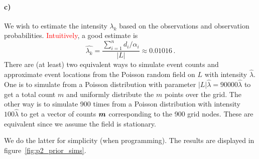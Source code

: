 \paragraph{c)}
We wish to estimate the intensity $\lambda_k$ based on the observations and observation probabilities. \textcolor{red}{Intuitively}, a good estimate is
%
\begin{equation*}
    \hat{\lambda_k} = \frac{\sum_{i=1}^n d_i / \alpha_i}{|L|} \approx 0.01016 \, .
\end{equation*}
%
There are (at least) two equivalent ways to simulate event counts and approximate event locations from the Poisson random field on $L$ with intensity $\hat{\lambda}$. One is to simulate from a Poisson distribution with parameter $|L|\hat{\lambda} = 90000\hat{\lambda}$ to get a total count $m$ and uniformly distribute the $m$ points over the grid. The other way is to simulate 900 times from a Poisson distribution with intensity $100\hat{\lambda}$ to get a vector of counts $\bm{m}$ corresponding to the 900 grid nodes. These are equivalent since we assume the field is stationary.

We do the latter for simplicity (when programming). The results are displayed in figure~\ref{fig:p2_prior_sims}.

